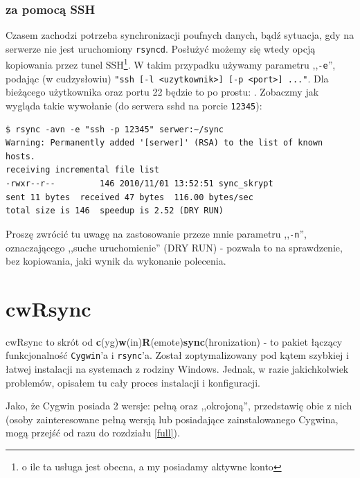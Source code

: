 \subsubsection{za pomocą SSH}
Czasem zachodzi potrzeba synchronizacji poufnych danych, bądź sytuacja, gdy na serwerze nie jest uruchomiony \verb|rsyncd|. Posłużyć możemy się wtedy opcją kopiowania przez tunel SSH\footnote{o ile ta usługa jest obecna, a my posiadamy aktywne konto}. W takim przypadku używamy parametru ,,\verb|-e|'', podając (w cudzysłowiu) \verb|"ssh [-l <uzytkownik>] [-p <port>] ..."|. Dla bieżącego użytkownika oraz portu 22 będzie to po prostu: . Zobaczmy jak wygląda takie wywołanie (do serwera sshd na porcie \verb|12345|):
\begin{verbatim}
$ rsync -avn -e "ssh -p 12345" serwer:~/sync 
Warning: Permanently added '[serwer]' (RSA) to the list of known hosts.
receiving incremental file list
-rwxr--r--         146 2010/11/01 13:52:51 sync_skrypt
sent 11 bytes  received 47 bytes  116.00 bytes/sec
total size is 146  speedup is 2.52 (DRY RUN)
\end{verbatim}
Proszę zwrócić tu uwagę na zastosowanie przeze mnie parametru ,,\verb|-n|'', oznaczającego ,,suche uruchomienie'' (DRY RUN) - pozwala to na sprawdzenie, bez kopiowania, jaki wynik da wykonanie polecenia.


\section{cwRsync}
\label{cwrsync}
cwRsync to skrót od {\bf c}(yg){\bf w}(in){\bf R}(emote){\bf sync}(hronization) - to pakiet łączący funkcjonalność \verb|Cygwin|'a \cite{7} i \verb|rsync|'a. Został zoptymalizowany pod kątem szybkiej i łatwej instalacji na systemach z rodziny Windows. Jednak, w razie jakichkolwiek problemów, opisałem tu cały proces instalacji i konfiguracji.

Jako, że Cygwin posiada 2 wersje: pełną oraz ,,okrojoną'', przedstawię obie z nich (osoby zainteresowane pełną wersją lub posiadające zainstalowanego Cygwina, mogą przejść od razu do rozdziału \ref{full}).

